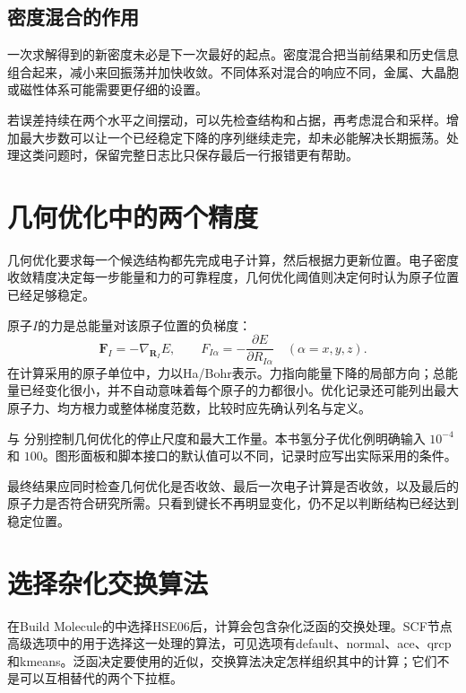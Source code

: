 \subsection{密度混合的作用}

一次求解得到的新密度未必是下一次最好的起点。密度混合把当前结果和历史信息组合起来，减小来回振荡并加快收敛。不同体系对混合的响应不同，金属、大晶胞或磁性体系可能需要更仔细的设置。

若误差持续在两个水平之间摆动，可以先检查结构和占据，再考虑混合和采样。增加最大步数可以让一个已经稳定下降的序列继续走完，却未必能解决长期振荡。处理这类问题时，保留完整日志比只保存最后一行报错更有帮助。

\section{几何优化中的两个精度}

几何优化要求每一个候选结构都先完成电子计算，然后根据力更新位置。电子密度收敛精度决定每一步能量和力的可靠程度，几何优化阈值则决定何时认为原子位置已经足够稳定。


原子$I$的力是总能量对该原子位置的负梯度：
\begin{equation}
  \mathbf F_I=-\nabla_{\mathbf R_I}E,
  \qquad F_{I\alpha}=-\frac{\partial E}{\partial R_{I\alpha}}
  \quad(\alpha=x,y,z).
  \label{eq:atomic-force}
\end{equation}
在计算采用的原子单位中，力以Ha/Bohr表示。力指向能量下降的局部方向；总能量已经变化很小，并不自动意味着每个原子的力都很小。优化记录还可能列出最大原子力、均方根力或整体梯度范数，比较时应先确认列名与定义。

 与  分别控制几何优化的停止尺度和最大工作量。本书氢分子优化例明确输入 $10^{-4}$ 和 $100$。图形面板和脚本接口的默认值可以不同，记录时应写出实际采用的条件。

最终结果应同时检查几何优化是否收敛、最后一次电子计算是否收敛，以及最后的原子力是否符合研究所需。只看到键长不再明显变化，仍不足以判断结构已经达到稳定位置。

\section{选择杂化交换算法}

在Build Molecule的中选择HSE06后，计算会包含杂化泛函的交换处理。SCF节点高级选项中的用于选择这一处理的算法，可见选项有default、normal、ace、qrcp和kmeans。泛函决定要使用的近似，交换算法决定怎样组织其中的计算；它们不是可以互相替代的两个下拉框。

